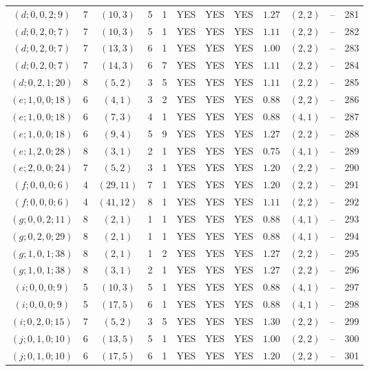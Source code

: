 \begin{longtable}{|c|c|c|c|c|c|c|c|c|c|c|c|}
$(d;0,0,2;9)$ & 7 & $(10,3)$ & 5 & 1 & YES & YES & YES & $1.27$ & $(2,2)$ & -- & 281\\
$(d;0,2,0;7)$ & 7 & $(10,3)$ & 5 & 1 & YES & YES & YES & $1.11$ & $(2,2)$ & -- & 282\\
$(d;0,2,0;7)$ & 7 & $(13,3)$ & 6 & 1 & YES & YES & YES & $1.00$ & $(2,2)$ & -- & 283\\
$(d;0,2,0;7)$ & 7 & $(14,3)$ & 6 & 7 & YES & YES & YES & $1.11$ & $(2,2)$ & -- & 284\\
$(d;0,2,1;20)$ & 8 & $(5,2)$ & 3 & 5 & YES & YES & YES & $1.11$ & $(2,2)$ & -- & 285\\
$(e;1,0,0;18)$ & 6 & $(4,1)$ & 3 & 2 & YES & YES & YES & $0.88$ & $(2,2)$ & -- & 286\\
$(e;1,0,0;18)$ & 6 & $(7,3)$ & 4 & 1 & YES & YES & YES & $0.88$ & $(4,1)$ & -- & 287\\
$(e;1,0,0;18)$ & 6 & $(9,4)$ & 5 & 9 & YES & YES & YES & $1.27$ & $(2,2)$ & -- & 288\\
$(e;1,2,0;28)$ & 8 & $(3,1)$ & 2 & 1 & YES & YES & YES & $0.75$ & $(4,1)$ & -- & 289\\
$(e;2,0,0;24)$ & 7 & $(5,2)$ & 3 & 1 & YES & YES & YES & $1.20$ & $(2,2)$ & -- & 290\\
$(f;0,0,0;6)$ & 4 & $(29,11)$ & 7 & 1 & YES & YES & YES & $1.20$ & $(2,2)$ & -- & 291\\
$(f;0,0,0;6)$ & 4 & $(41,12)$ & 8 & 1 & YES & YES & YES & $1.11$ & $(2,2)$ & -- & 292\\
$(g;0,0,2;11)$ & 8 & $(2,1)$ & 1 & 1 & YES & YES & YES & $0.88$ & $(4,1)$ & -- & 293\\
$(g;0,2,0;29)$ & 8 & $(2,1)$ & 1 & 1 & YES & YES & YES & $0.88$ & $(4,1)$ & -- & 294\\
$(g;1,0,1;38)$ & 8 & $(2,1)$ & 1 & 2 & YES & YES & YES & $1.27$ & $(2,2)$ & -- & 295\\
$(g;1,0,1;38)$ & 8 & $(3,1)$ & 2 & 1 & YES & YES & YES & $1.27$ & $(2,2)$ & -- & 296\\
$(i;0,0,0;9)$ & 5 & $(10,3)$ & 5 & 1 & YES & YES & YES & $0.88$ & $(4,1)$ & -- & 297\\
$(i;0,0,0;9)$ & 5 & $(17,5)$ & 6 & 1 & YES & YES & YES & $0.88$ & $(4,1)$ & -- & 298\\
$(i;0,2,0;15)$ & 7 & $(5,2)$ & 3 & 5 & YES & YES & YES & $1.30$ & $(2,2)$ & -- & 299\\
$(j;0,1,0;10)$ & 6 & $(13,5)$ & 5 & 1 & YES & YES & YES & $1.00$ & $(2,2)$ & -- & 300\\
$(j;0,1,0;10)$ & 6 & $(17,5)$ & 6 & 1 & YES & YES & YES & $1.20$ & $(2,2)$ & -- & 301
\end{longtable}
